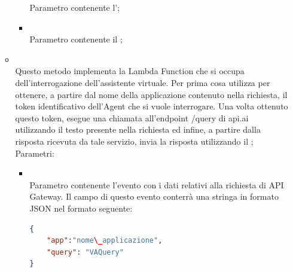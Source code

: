 \begin{itemize}
\begin{itemize}
\begin{itemize}
			Parametro contenente l';
			\item {} \\
			Parametro contenente il ;
		\end{itemize}
		\item[]  \\		Questo metodo implementa la Lambda Function che si occupa dell'interrogazione dell'assistente virtuale. Per prima cosa utilizza  per ottenere, a partire dal nome della applicazione contenuto nella richiesta, il token identificativo dell'Agent che si vuole interrogare. Una volta ottenuto questo token, esegue una chiamata all'endpoint /query di api.ai  utilizzando il testo presente nella richiesta ed infine, a partire dalla risposta ricevuta da tale servizio, invia la risposta utilizzando il ;\\
		Parametri:
		\begin{itemize}
			\item {} \\
			Parametro contenente l'evento con i dati relativi alla richiesta di API Gateway. Il campo  di questo evento conterrà una stringa in formato JSON nel formato seguente:

\begin{lstlisting}[language=json,firstnumber=1]
{
    "app":"nome\_applicazione",
    "query": "VAQuery"
}
\end{lstlisting}


\end{itemize}
\end{itemize}
\end{itemize}
